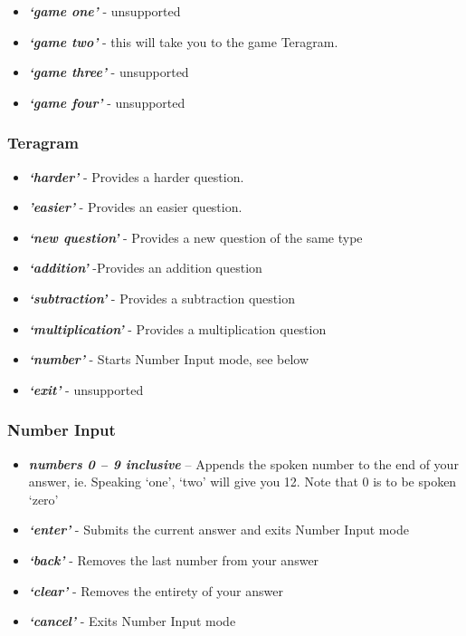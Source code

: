 \documentclass[11pt, oneside]{article}
\begin{document}
\begin{itemize}
  \item {\em\bf`game one'} - unsupported
  \item {\em\bf`game two'}  - this will take you to the game Teragram.
  \item {\em\bf`game three'} - unsupported
  \item {\em\bf`game four'} - unsupported
\end{itemize}

\subsubsection*{Teragram}

\begin{itemize}
  \item {\em\bf`harder'} - Provides a harder question. 
  \item {\em\bf'easier'} - Provides an easier question.
  \item {\em\bf`new question'} - Provides a new question of the same type
  \item {\em\bf`addition'} -Provides an addition question
  \item {\em\bf`subtraction'} - Provides a subtraction question
  \item {\em\bf`multiplication'} - Provides a multiplication question 
  \item {\em\bf`number'} - Starts Number Input mode, see below
  \item {\em\bf`exit'} - unsupported
\end{itemize}

\pagebreak

\subsubsection*{Number Input}
\begin{itemize}
  \item {\em\bf numbers 0 – 9 inclusive} – Appends the spoken number
    to the end of your answer, ie. Speaking `one', `two' will give you
    12. Note that 0 is to be spoken `zero'
  \item {\em\bf `enter'} - Submits the current answer and exits Number
    Input mode
  \item {\em\bf `back'} - Removes the last number from your answer
  \item {\em\bf `clear'} - Removes the entirety of your answer
  \item {\em\bf `cancel'} - Exits Number Input mode
\end{itemize}
\end{document}
